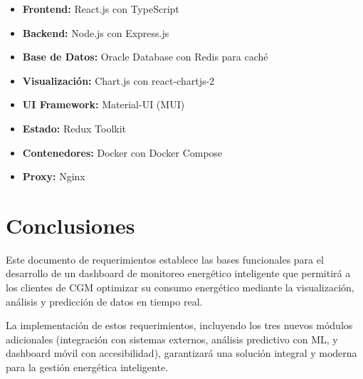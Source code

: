 \documentclass[12pt,a4paper]{article}
\begin{document}
\begin{itemize}
    \item \textbf{Frontend:} React.js con TypeScript
    \item \textbf{Backend:} Node.js con Express.js
    \item \textbf{Base de Datos:} Oracle Database con Redis para caché
    \item \textbf{Visualización:} Chart.js con react-chartjs-2
    \item \textbf{UI Framework:} Material-UI (MUI)
    \item \textbf{Estado:} Redux Toolkit
    \item \textbf{Contenedores:} Docker con Docker Compose
    \item \textbf{Proxy:} Nginx
\end{itemize}

\section{Conclusiones}

Este documento de requerimientos establece las bases funcionales para el desarrollo de un dashboard de monitoreo energético inteligente que permitirá a los clientes de CGM optimizar su consumo energético mediante la visualización, análisis y predicción de datos en tiempo real.

La implementación de estos requerimientos, incluyendo los tres nuevos módulos adicionales (integración con sistemas externos, análisis predictivo con ML, y dashboard móvil con accesibilidad), garantizará una solución integral y moderna para la gestión energética inteligente.
\end{document}
